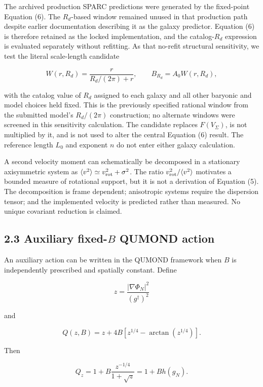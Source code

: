 \documentclass[utf8]{FrontiersinHarvard}
\begin{document}
The archived production SPARC predictions were generated by the fixed-point Equation (6). The \(R_d\)-based window remained unused in that production path despite earlier documentation describing it as the galaxy predictor. Equation (6) is therefore retained as the locked implementation, and the catalog-\(R_d\) expression is evaluated separately without refitting. As that no-refit structural sensitivity, we test the literal scale-length candidate

\[
W(r,R_d)=\frac{r}{R_d/(2\pi)+r},
\qquad B_{R_d}=A_0W(r,R_d),
\]

with the catalog value of \(R_d\) assigned to each galaxy and all other baryonic and model choices held fixed. This is the previously specified rational window from the submitted model's \(R_d/(2\pi)\) construction; no alternate windows were screened in this sensitivity calculation. The candidate replaces \(F(V_\Sigma)\), is not multiplied by it, and is not used to alter the central Equation (6) result. The reference length \(L_0\) and exponent \(n\) do not enter either galaxy calculation.

A second velocity moment can schematically be decomposed in a stationary axisymmetric system as \(\langle v^2\rangle\simeq v_{\rm rot}^2+\sigma^2\). The ratio \(v_{\rm rot}^2/\langle v^2\rangle\) motivates a bounded measure of rotational support, but it is not a derivation of Equation (5). The decomposition is frame dependent; anisotropic systems require the dispersion tensor; and the implemented velocity is predicted rather than measured. No unique covariant reduction is claimed.

\subsection{\texorpdfstring{2.3 Auxiliary fixed-\(B\) QUMOND action}{2.3 Auxiliary fixed-B QUMOND action}}\label{auxiliary-fixed-b-qumond-action}

An auxiliary action can be written in the QUMOND framework \citep{milgrom2010} when \(B\) is independently prescribed and spatially constant. Define

\[
z=\frac{|\nabla\Phi_N|^2}{(g^\dagger)^2}
\tag{7}
\]

and

\[
Q(z,B)=z+4B\left[z^{1/4}-\arctan\!\left(z^{1/4}\right)\right].
\tag{8}
\]

Then

\[
Q_z=1+B\frac{z^{-1/4}}{1+\sqrt z}
=1+B h(g_N).
\tag{9}
\]
\end{document}

